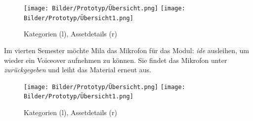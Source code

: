 \begin{figure}[h]
    \centering
    \texttt{[image: Bilder/Prototyp/Übersicht.png]}\hspace{2em}
    \texttt{[image: Bilder/Prototyp/Übersicht1.png]}
    \label{fig:p4}
    \caption[Mockup: Kategorien, Assets, Assetdetails]{Kategorien (l), Assetdetails (r)}
\end{figure}

Im vierten Semester möchte Mila das Mikrofon für das Modul: \textit{\ac{ide}} ausleihen, um wieder
ein Voiceover aufnehmen zu können. Sie findet das Mikrofon unter \textit{zurückgegeben} und
leiht das Material erneut aus.

\begin{figure}[h]
    \centering
    \texttt{[image: Bilder/Prototyp/Übersicht.png]}\hspace{2em}
    \texttt{[image: Bilder/Prototyp/Übersicht1.png]}
    \label{fig:p4}
    \caption[Mockup: Kategorien, Assets, Assetdetails]{Kategorien (l), Assetdetails (r)}
\end{figure}